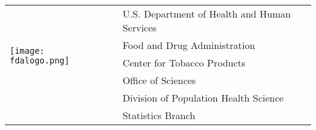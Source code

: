 \documentclass[letterpaper,11pt]{article}
\begin{document}


\vspace{-25pt}%

\begin{tabular}[t]{lp{1in}l}
	\multirow{5}{*}{\texttt{[image: fdalogo.png]}} && U.S. Department of Health and Human Services \leavevmode  \\
																								&& Food and Drug Administration \\
																								&& Center for Tobacco Products \\
																								&& Office of Sciences \\
																								&& Division of Population Health Science \\
																								&& Statistics Branch \\
\end{tabular}


\leavevmode \newline \vspace{15pt} \newline\vspace{0.015in}
\end{document}
